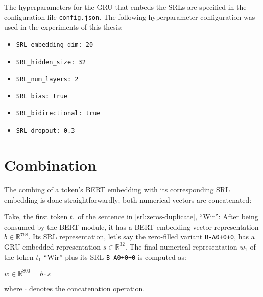 \begin{tcolorbox}[
  colback=blue!5!white,
  colframe=blue!75!black,
  title={\centering Code}]

  The hyperparameters for the GRU that embeds the SRLs are specified in the configuration file
  \texttt{config.json}. The following hyperparameter configuration was used in the experiments
  of this thesis:

  \begin{itemize}
    \itemsep0em
	  \item[] \texttt{SRL\_embedding\_dim: 20}
	  \item[] \texttt{SRL\_hidden\_size: 32}
	  \item[] \texttt{SRL\_num\_layers: 2}
	  \item[] \texttt{SRL\_bias: true}
	  \item[] \texttt{SRL\_bidirectional: true}
	  \item[] \texttt{SRL\_dropout: 0.3}
  \end{itemize}

\end{tcolorbox}



\section{Combination}

The combing of a token's BERT embedding with its corresponding SRL embedding is done
straightforwardly; both numerical vectors are concatenated:

Take, the first token $t_1$ of the sentence in \ref{srl:zeros-duplicate},
``Wir'': After being consumed by the BERT module, it has a BERT embedding
vector representation $b \in \mathbb{R}^{768}$. Its SRL representation,
let's say the zero-filled variant \texttt{B-A0+0+0}, has a GRU-embedded
representation $s \in \mathbb{R}^{32}$. The final numerical representation
$w_1$ of the token $t_1$ ``Wir'' plus its SRL \texttt{B-A0+0+0} is computed
as:

$w \in \mathbb{R}^{800} = b \cdot  s$

where $\cdot$ denotes the concatenation operation.

